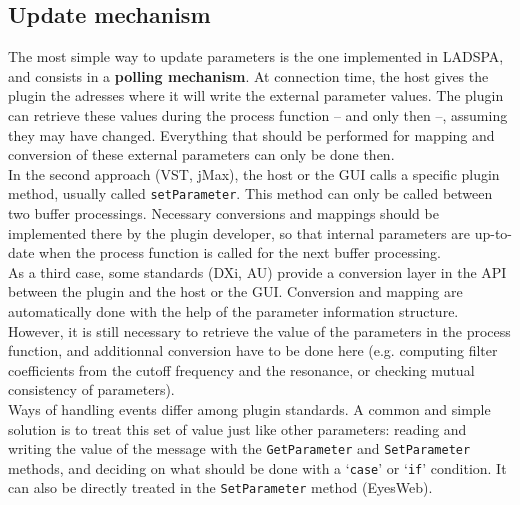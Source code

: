 \subsection{Update mechanism}

\noindent The most simple way to update parameters is the one implemented in LADSPA, and consists in a \textbf{polling mechanism}. At connection time, the host gives the plugin the adresses where it will write the external parameter values. The plugin can retrieve these values during the process function -- and only then --, assuming they may have changed. Everything that should be performed for mapping and conversion of these external parameters can only be done then.\\

\noindent In the second approach (VST, jMax), the host or the GUI calls a specific plugin method, usually called \verb|setParameter|. This method can only be called between two buffer processings. Necessary conversions and mappings should be implemented there by the plugin developer, so that internal parameters are up-to-date when the process function is called for the next buffer processing.\\

\noindent As a third case, some standards (DXi, AU) provide a conversion layer in the API between the plugin and the host or the GUI. Conversion and mapping are automatically done with the help of the parameter information structure. However, it is still necessary to retrieve the value of the parameters in the process function, and additionnal conversion have to be done here (e.g. computing filter coefficients from the cutoff frequency and the resonance, or checking mutual consistency of parameters).\\

\noindent Ways of handling events differ among plugin standards. A common and simple solution is to treat this set of value just like other parameters: reading and writing the value of the message with the \verb|GetParameter| and \verb|SetParameter| methods, and deciding on what should be done with a `\verb|case|' or `\verb|if|' condition. It can also be directly treated in the \verb|SetParameter| method (EyesWeb).




